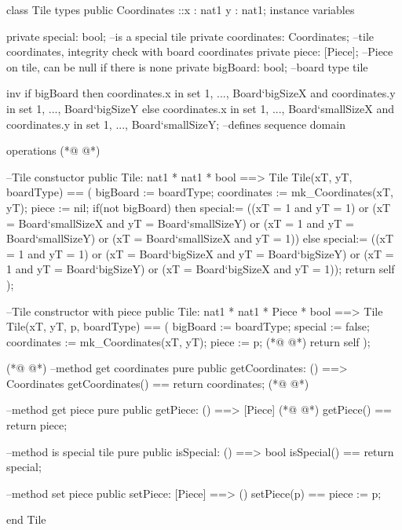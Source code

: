 \begin{vdmpp}[breaklines=true]
class Tile
types
  public Coordinates ::x : nat1
             y : nat1;
instance variables

  private special: bool; --is a special tile
  private coordinates: Coordinates; --tile coordinates, integrity check with board coordinates
  private piece: [Piece]; --Piece on tile, can be null if there is none
  private bigBoard: bool; --board type tile
  
  inv if bigBoard then coordinates.x in set {1, ..., Board`bigSizeX} and
    coordinates.y in set {1, ..., Board`bigSizeY}
    else coordinates.x in set {1, ..., Board`smallSizeX} and
    coordinates.y in set {1, ..., Board`smallSizeY}; --defines sequence domain
  
operations
(*@
\label{Tile:18}
@*)

  --Tile constuctor
  public Tile: nat1 * nat1 * bool ==> Tile
  Tile(xT, yT, boardType) == (
    bigBoard := boardType;
    coordinates := mk_Coordinates(xT, yT);
    piece := nil;
    if(not bigBoard) then
     special:= ((xT = 1 and yT = 1) or (xT = Board`smallSizeX and yT = Board`smallSizeY) or
      (xT = 1 and yT = Board`smallSizeY) or (xT = Board`smallSizeX and yT = 1))
    else special:= ((xT = 1 and yT = 1) or (xT = Board`bigSizeX and yT = Board`bigSizeY) or
      (xT = 1 and yT = Board`bigSizeY) or (xT = Board`bigSizeX and yT = 1));
    return self
  );
  
  --Tile constructor with piece
  public Tile: nat1 * nat1 * Piece * bool ==> Tile
    Tile(xT, yT, p, boardType) == (
    bigBoard := boardType;
    special := false;
    coordinates := mk_Coordinates(xT, yT);
    piece := p;
(*@
\label{getCoordinates:40}
@*)
    return self
  );
  
(*@
\label{getPiece:43}
@*)
  --method get coordinates
  pure public getCoordinates: () ==> Coordinates
  getCoordinates() == return coordinates;
(*@
\label{isSpecial:46}
@*)
  
  --method get piece
  pure public getPiece: () ==> [Piece]
(*@
\label{setPiece:49}
@*)
  getPiece() == return piece;
  
  --method is special tile
  pure public isSpecial: () ==> bool
  isSpecial() == return special;
  
  --method set piece
  public setPiece: [Piece] ==> ()
  setPiece(p) == piece := p;
  
end Tile
\end{vdmpp}
\bigskip
